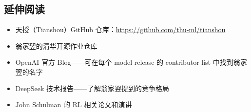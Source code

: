 \subsection{延伸阅读}

\begin{itemize}
    \item 天授（Tianshou）GitHub 仓库：\url{https://github.com/thu-ml/tianshou}
    \item 翁家翌的清华开源作业仓库
    \item OpenAI 官方 Blog——可在每个 model release 的 contributor list 中找到翁家翌的名字
    \item DeepSeek 技术报告——了解翁家翌提到的竞争格局
    \item John Schulman 的 RL 相关论文和演讲
\end{itemize}



